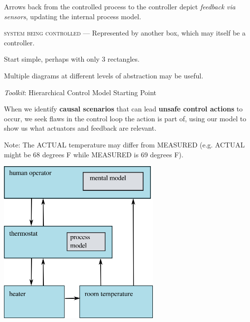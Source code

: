 \documentclass[letterpaper]{tufte-book}
\begin{document}
\begin{landscape}
\begin{multicols}{2}
\begin{compactitem}
Arrows back from the controlled process to the controller depict \emph{feedback via sensors}, updating the internal process model.
\item \textsc{system being controlled} --- Represented by another box, which may itself be a controller.
\end{compactitem}  

\begin{compactitem}
\setlength{\itemsep}{0pt}
\setlength{\parskip}{.25em}
\item Start simple, perhaps with only 3 rectangles.
\item Multiple diagrams at different levels of abstraction may be useful.
\end{compactitem}  

\emph{Toolkit}: Hierarchical Control Model Starting Point



When we identify \textbf{causal scenarios} that can lead \textbf{unsafe control actions} to occur, we seek flaws in the control loop the action is part of, using our model to show us what actuators and feedback are relevant.

\pagebreak




Note: The ACTUAL temperature may differ from MEASURED (e.g. ACTUAL might be 68 degrees F while MEASURED is 69 degrees F).

 \columnbreak
 

\begin{center}
\includegraphics[width=8cm]{thermostat_model}
\end{center}
 
\end{multicols}
\end{landscape}
\end{document}
